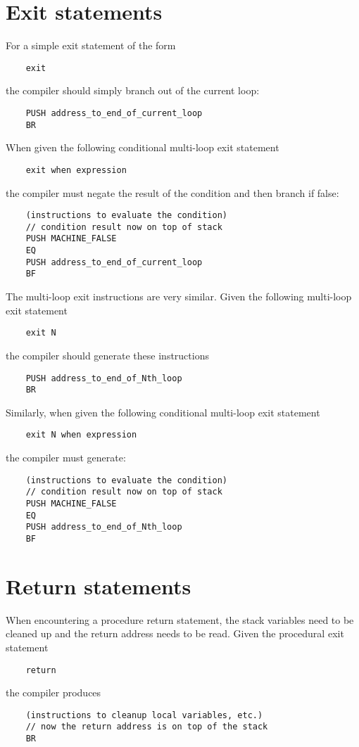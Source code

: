 \documentclass{article}
\begin{document}
\newpage
\section{Exit statements}

For a simple exit statement of the form
\begin{lstlisting}
    exit
\end{lstlisting}
the compiler should simply branch out of the current loop:
\begin{lstlisting}
    PUSH address_to_end_of_current_loop
    BR
\end{lstlisting}

\noindent
When given the following conditional multi-loop exit statement
\begin{lstlisting}
    exit when expression
\end{lstlisting}
the compiler must negate the result of the condition and then branch if false:
\begin{lstlisting}
    (instructions to evaluate the condition)
    // condition result now on top of stack
    PUSH MACHINE_FALSE
    EQ
    PUSH address_to_end_of_current_loop
    BF
\end{lstlisting}

\noindent
The multi-loop exit instructions are very similar.
Given the following multi-loop exit statement
\begin{lstlisting}
    exit N
\end{lstlisting}
the compiler should generate these instructions
\begin{lstlisting}
    PUSH address_to_end_of_Nth_loop
    BR
\end{lstlisting}

\noindent
Similarly, when given the following conditional multi-loop exit statement
\begin{lstlisting}
    exit N when expression
\end{lstlisting}
the compiler must generate:
\begin{lstlisting}
    (instructions to evaluate the condition)
    // condition result now on top of stack
    PUSH MACHINE_FALSE
    EQ
    PUSH address_to_end_of_Nth_loop
    BF
\end{lstlisting}

\section{Return statements}
When encountering a procedure return statement, the stack variables need to be cleaned up and the return address needs to be read.
\newline
Given the procedural exit statement
\begin{lstlisting}
    return
\end{lstlisting}
the compiler produces
\begin{lstlisting}
    (instructions to cleanup local variables, etc.)
    // now the return address is on top of the stack
    BR
\end{lstlisting}
\end{document}
